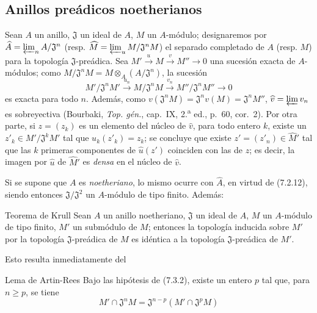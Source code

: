 \subsection{Anillos preádicos noetherianos}
\label{subsection:0.7.3-fr}

\begin{env}[7.3.1]
\label{0.7.3.1-fr}
Sean $A$ un anillo, $\mathfrak J$ un ideal de $A$, $M$ un $A$-módulo;
designaremos por
$\widehat A=\varprojlim_n A/\mathfrak J^n$ (resp.
$\widehat M=\varprojlim_u M/\mathfrak J^nM$) el separado completado de $A$
(resp. $M$) para la topología $\mathfrak J$-preádica. Sea
$M'\xrightarrow{u}M\xrightarrow{v}M''\to0$
una sucesión exacta de $A$-módulos; como
$M/\mathfrak J^nM=M\otimes_A(A/\mathfrak J^n)$, la sucesión
\[
  M'/\mathfrak J^nM'\xrightarrow{u_n}
  M/\mathfrak J^nM\xrightarrow{v_n}
  M''/\mathfrak J^nM''\to0
\]
es exacta para todo $n$. Además, como
$v(\mathfrak J^nM)=\mathfrak J^nv(M)=\mathfrak J^nM''$,
$\widehat v=\varprojlim v_n$ es sobreyectiva (Bourbaki,
\emph{Top. gén.}, cap.~IX, 2.\textsuperscript{a} ed., p.~60, cor.~2).
Por otra parte, si $z=(z_k)$ es un elemento del núcleo de $\widehat v$, para todo
entero $k$, existe un $z'_k\in M'/\mathfrak J^kM'$ tal que
$u_k(z'_k)=z_k$; se concluye que existe
$z'=(z'_n)\in\widehat{M}'$ tal que las $k$ primeras componentes de
$\widehat u(z')$ coinciden con las de $z$; es decir, la imagen por
$\widehat u$ de $\widehat{M}'$ es \emph{densa} en el núcleo de
$\widehat v$.

Si se supone que $A$ es \emph{noetheriano}, lo mismo ocurre con $\widehat A$, en
virtud de (7.2.12), siendo entonces $\mathfrak J/\mathfrak J^2$ un $A$-módulo de
tipo finito. Además:
\end{env}

\begin{namedtheorem}[7.3.2]{Teorema de Krull}
\label{0.7.3.2-fr}
Sean $A$ un anillo \textup{noetheriano}, $\mathfrak J$ un ideal de $A$, $M$ un
$A$-módulo \textup{de tipo finito}, $M'$ un submódulo de $M$; entonces la topología
inducida sobre $M'$ por la topología $\mathfrak J$-preádica de $M$ es idéntica
a la topología $\mathfrak J$-preádica de $M'$.
\end{namedtheorem}

Esto resulta inmediatamente del

\begin{namedlemma}[7.3.2.1]{Lema de Artin-Rees}
\label{0.7.3.2.1-fr}
Bajo las hipótesis de \textup{(7.3.2)}, existe un entero $p$ tal que, para
$n\geq p$, se tiene
\[
  M'\cap\mathfrak J^nM=\mathfrak J^{n-p}
  (M'\cap\mathfrak J^pM)
\]
\end{namedlemma}

